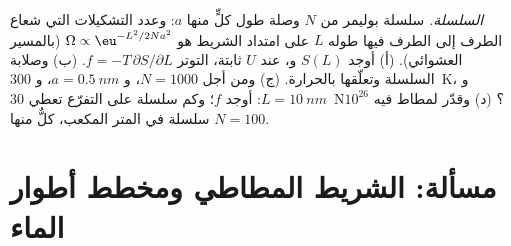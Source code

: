 \begin{exercise}[$\star\star\star$]\label{exo:b2:thermodynamic-potentials:12}
\emph{السلسلة.} سلسلة بوليمر من $N$ وصلة طول كلٍّ منها $a$: وعدد
التشكيلات التي شعاع الطرف إلى الطرف فيها طوله $L$ على امتداد
الشريط هو $\Omega \propto \eu^{-L^2/2Na^2}$ (بالمسير العشوائي). (أ) أوجد $S(L)$
و، عند $U$ ثابتة، التوتر $f = -T\,\partial S/\partial L$. (ب) وصلابة
السلسلة وتعلّقها بالحرارة. (ج) ومن أجل $N = 1000$، و $a =
\qty{0.5}{nm}$، و \qty{300}{K}، و $L = \qty{10}{nm}$: أوجد $f$؛ وكم سلسلة على
التفرّع تعطي \qty{30}{N}؟ (د) وقدّر  لمطاط
فيه $10^{26}$ سلسلة في المتر المكعب، كلٌّ منها $N = 100$.
\end{exercise}

\section{مسألة: الشريط المطاطي ومخطط أطوار الماء}

